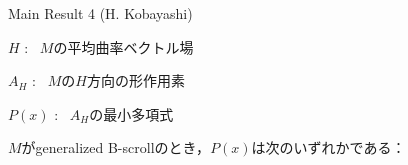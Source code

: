 \documentclass[dvipdfmx, xcolor=svgnames]{beamer}
\theoremstyle{plain}
\theoremstyle{definition}
\theoremstyle{remark}
\begin{document}
{\begin{alertblock}{Main Result 4 (H. Kobayashi)}
{    \hspace{6pt}\(H\)\hspace{5pt} : \, \(M\)の平均曲率ベクトル場\vspace{3pt}
    
    \hspace{4pt}\(A_H\)\hspace{2pt} : \, \(M\)の\(H\)方向の形作用素\vspace{3pt}

    \(P(x)\) : \, \(A_H\)の最小多項式\vspace{7pt}

    \(M\)がgeneralized B-scrollのとき，\(P(x)\)は次のいずれかである：
    
}
\end{alertblock}}
\end{document}
